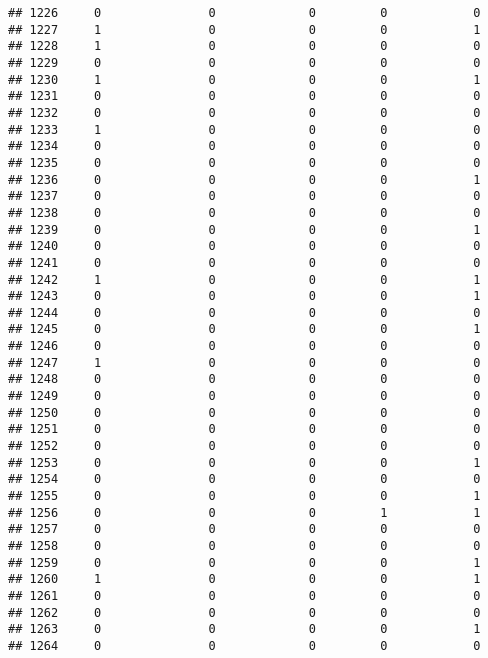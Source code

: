 \documentclass[]{article}
\begin{document}
\begin{verbatim}
## 1226     0               0             0         0            0
## 1227     1               0             0         0            1
## 1228     1               0             0         0            0
## 1229     0               0             0         0            0
## 1230     1               0             0         0            1
## 1231     0               0             0         0            0
## 1232     0               0             0         0            0
## 1233     1               0             0         0            0
## 1234     0               0             0         0            0
## 1235     0               0             0         0            0
## 1236     0               0             0         0            1
## 1237     0               0             0         0            0
## 1238     0               0             0         0            0
## 1239     0               0             0         0            1
## 1240     0               0             0         0            0
## 1241     0               0             0         0            0
## 1242     1               0             0         0            1
## 1243     0               0             0         0            1
## 1244     0               0             0         0            0
## 1245     0               0             0         0            1
## 1246     0               0             0         0            0
## 1247     1               0             0         0            0
## 1248     0               0             0         0            0
## 1249     0               0             0         0            0
## 1250     0               0             0         0            0
## 1251     0               0             0         0            0
## 1252     0               0             0         0            0
## 1253     0               0             0         0            1
## 1254     0               0             0         0            0
## 1255     0               0             0         0            1
## 1256     0               0             0         1            1
## 1257     0               0             0         0            0
## 1258     0               0             0         0            0
## 1259     0               0             0         0            1
## 1260     1               0             0         0            1
## 1261     0               0             0         0            0
## 1262     0               0             0         0            0
## 1263     0               0             0         0            1
## 1264     0               0             0         0            0

\end{verbatim}
\end{document}
